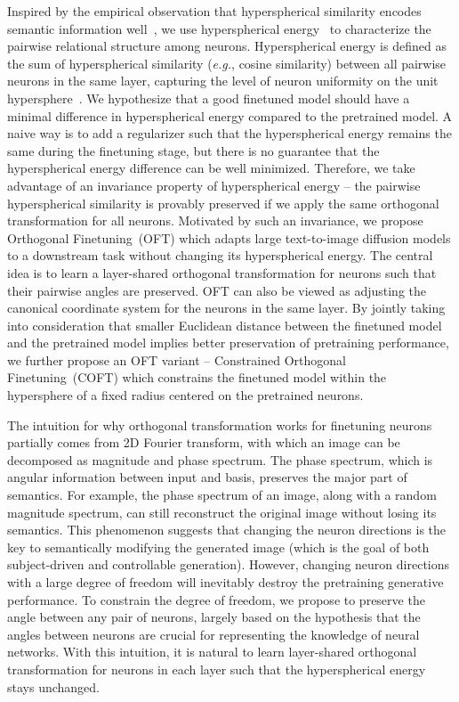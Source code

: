 Inspired by the empirical observation that hyperspherical similarity encodes semantic information well~\cite{liu2017deep,liu2018decoupled,chen2020angular}, we use hyperspherical energy~\cite{liu2018learning} to characterize the pairwise relational structure among neurons. Hyperspherical energy is defined as the sum of hyperspherical similarity (\emph{e.g.}, cosine similarity) between all pairwise neurons in the same layer, capturing the level of neuron uniformity on the unit hypersphere~\cite{liu2021learning}. We hypothesize that a good finetuned model should have a minimal difference in hyperspherical energy compared to the pretrained model. A naive way is to add a regularizer such that the hyperspherical energy remains the same during the finetuning stage, but there is no guarantee that the hyperspherical energy difference can be well minimized. Therefore, we take advantage of an invariance property of hyperspherical energy -- the pairwise hyperspherical similarity is provably preserved if we apply the same orthogonal transformation for all neurons. Motivated by such an invariance, we propose Orthogonal Finetuning~(OFT) which adapts large text-to-image diffusion models to a downstream task without changing its hyperspherical energy. The central idea is to learn a layer-shared orthogonal transformation for neurons such that their pairwise angles are preserved. OFT can also be viewed as adjusting the canonical coordinate system for the neurons in the same layer. By jointly taking into consideration that smaller Euclidean distance between the finetuned model and the pretrained model implies better preservation of pretraining performance, we further propose an OFT variant -- Constrained Orthogonal Finetuning~(COFT) which constrains the finetuned model within the hypersphere of a fixed radius centered on the pretrained neurons.

The intuition for why orthogonal transformation works for finetuning neurons partially comes from 2D Fourier transform, with which an image can be decomposed as magnitude and phase spectrum. The phase spectrum, which is angular information between input and basis, preserves the major part of semantics. For example, the phase spectrum of an image, along with a random magnitude spectrum, can still reconstruct the original image without losing its semantics. This phenomenon suggests that changing the neuron directions is the key to semantically modifying the generated image (which is the goal of both subject-driven and controllable generation). However, changing neuron directions with a large degree of freedom will inevitably destroy the pretraining generative performance. To constrain the degree of freedom, we propose to preserve the angle between any pair of neurons, largely based on the hypothesis that the angles between neurons are crucial for representing the knowledge of neural networks. With this intuition, it is natural to learn layer-shared orthogonal transformation for neurons in each layer such that the hyperspherical energy stays unchanged.

